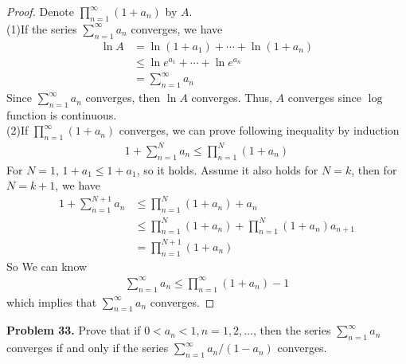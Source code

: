 \documentclass[12pt,leqno]{amsart}
\begin{document}
\begin{proof}
Denote $\prod_{n=1}^\infty (1+a_n)$ by $A$.\\
(1)If the series $\sum_{n=1}^\infty a_n$ converges, we have
\begin{align*}
    \ln A & = \ln (1 + a_1) + \cdots + \ln (1 + a_n) \\
    & \leq \ln e^{a_1} + \cdots + \ln e^{a_n} \\
    & = \sum^\infty_{n=1}  a_n
\end{align*}
Since $\sum_{n=1}^\infty a_n$ converges, then $\ln A$ converges. Thus, $A$ converges since $\log$ function is continuous.\\
(2)If $\prod_{n=1}^\infty (1+a_n)$ converges, we can prove following inequality by induction
\begin{align*}
    1 + \sum^N_{n=1}a_n \leq \prod^N_{n=1}(1+a_n)
\end{align*}
For $N=1$, $1+a_1 \leq 1+a_1$, so it holds. Assume it also holds for $N=k$, then for $N=k+1$, we have
\begin{align*}
    1 + \sum^{N+1}_{n=1}a_n & \leq \prod^N_{n=1}(1+a_n) + a_n \\
    & \leq \prod^N_{n=1}(1+a_n) + \prod^N_{n=1}(1+a_n) a_{n+1} \\
    & = \prod^{N+1}_{n=1}(1+a_n)
\end{align*}
So We can know 
\begin{align*}
    \sum^\infty_{n=1}a_n \leq \prod^\infty_{n=1}(1+a_n) - 1
\end{align*}
which implies that $\sum^\infty_{n=1}a_n$ converges.
\end{proof}

\medskip


\noindent
{\bf Problem 33.}
Prove that if $0<a_n<1, n=1,2,\ldots$, then the series
$\sum_{n=1}^\infty a_n$ converges if and only if the series
$\sum_{n=1}^\infty a_n/(1-a_n)$ converges.
\end{document}
